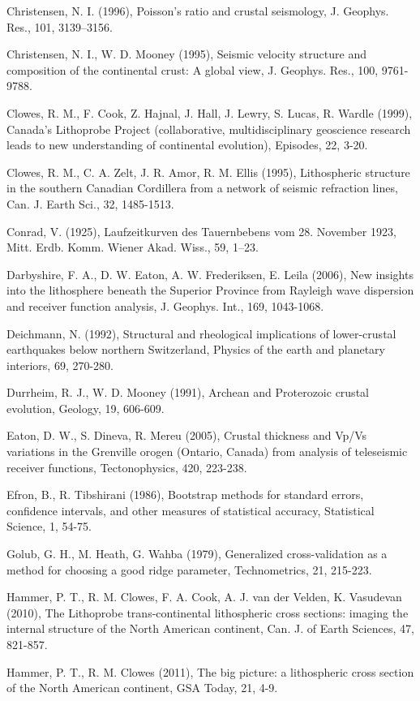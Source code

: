 \documentclass[review]{elsarticle}
\begin{document}
Christensen, N. I. (1996), Poisson's ratio and crustal seismology, J. Geophys. Res., 101, 3139–3156.

Christensen, N. I., W. D. Mooney (1995), Seismic velocity structure and composition of the continental crust: A global view, J. Geophys. Res., 100, 9761-9788.

Clowes, R. M., F. Cook, Z. Hajnal, J. Hall, J. Lewry, S. Lucas, R. Wardle (1999), Canada's Lithoprobe Project (collaborative, multidisciplinary geoscience research leads to new understanding of continental evolution), Episodes, 22, 3-20.

Clowes, R. M., C. A. Zelt, J. R. Amor, R. M. Ellis (1995), Lithospheric structure in the southern Canadian Cordillera from a network of seismic refraction lines, Can. J. Earth Sci., 32, 1485-1513.

Conrad, V. (1925), Laufzeitkurven des Tauernbebens vom 28. November 1923, Mitt. Erdb. Komm. Wiener Akad. Wiss., 59, 1–23.

Darbyshire, F. A., D. W. Eaton, A. W. Frederiksen, E. Leila (2006), New insights into the lithosphere beneath the Superior Province from Rayleigh wave dispersion and receiver function analysis, J. Geophys. Int., 169, 1043-1068.

Deichmann, N. (1992), Structural and rheological implications of lower-crustal earthquakes below northern Switzerland, Physics of the earth and planetary interiors, 69, 270-280.

Durrheim, R. J., W. D. Mooney (1991), Archean and Proterozoic crustal evolution, Geology, 19, 606-609.

Eaton, D. W., S. Dineva, R. Mereu (2005), Crustal thickness and Vp/Vs variations in the Grenville orogen (Ontario, Canada) from analysis of teleseismic receiver functions, Tectonophysics, 420, 223-238.

Efron, B., R. Tibshirani (1986), Bootstrap methods for standard errors, confidence intervals, and other measures of statistical accuracy, Statistical Science, 1, 54-75.

Golub, G. H., M. Heath, G. Wahba (1979), Generalized cross-validation as a method for choosing a good ridge parameter, Technometrics, 21, 215-223.

Hammer, P. T., R. M. Clowes, F. A. Cook, A. J. van der Velden, K. Vasudevan (2010), The Lithoprobe trans-continental lithospheric cross sections: imaging the internal structure of the North American continent, Can. J. of Earth Sciences, 47, 821-857.

Hammer, P. T., R. M. Clowes (2011), The big picture: a lithospheric cross section of the North American continent, GSA Today, 21, 4-9.
\end{document}
